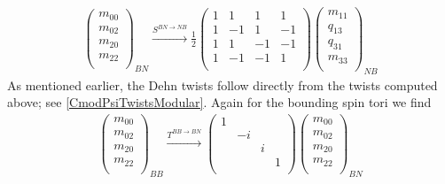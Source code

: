\begin{align}
\left( \begin{matrix}
m_{00}\\
m_{02}\\
m_{20}\\
m_{22}\\
\end{matrix} \right)_{BN}
\xrightarrow{S^{BN \rightarrow NB}}
\frac{1}{2} \left( \begin{matrix}
1&1&1&1\\
1&-1&1&-1\\
1&1&-1&-1\\
1&-1&-1&1\\
\end{matrix} \right)
\left( \begin{matrix}
m_{11}\\
q_{13}\\
q_{31}\\
m_{33}\\
\end{matrix} \right)_{NB}
\end{align}
As mentioned earlier, 
the Dehn twists follow directly from the twists computed above; 
see \eqref{CmodPsiTwistsModular}.
Again for the bounding spin tori we find
\begin{align}
\left( \begin{matrix}
m_{00}\\
m_{02}\\
m_{20}\\
m_{22}\\
\end{matrix} \right)_{BB}
\xrightarrow{T^{BB \rightarrow BN}}
\left( \begin{matrix}
1&&&\\
&-i&&\\
&&i&\\
&&&1\\
\end{matrix} \right)
\left( \begin{matrix}
m_{00}\\
m_{02}\\
m_{20}\\
m_{22}\\
\end{matrix} \right)_{BN}
\end{align}

